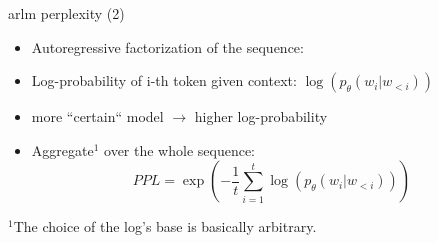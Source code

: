 \documentclass[11pt,compress,t,notes=noshow, xcolor=table]{beamer}
\begin{document}
\begin{frame}{arlm perplexity (2)}

\vfill
\begin{itemize}
	\item Autoregressive factorization of the sequence:
\end{itemize}

\begin{figure}
    \centering
\end{figure}

\begin{itemize}
	\item Log-probability of i-th token given context: $\log(p_\theta(w_i|w_{<i}))$
	\item[] more ``certain`` model $\to$ higher log-probability
	\item Aggregate$^1$ over the whole sequence:
				$$PPL = \exp\left(- \frac{1}{t} \sum_{i=1}^t \log(p_\theta(w_i|w_{<i}))\right)$$
\end{itemize}

\vfill

\footnotesize{$^1$The choice of the log’s base is basically arbitrary.}

\end{frame}

\end{document}
